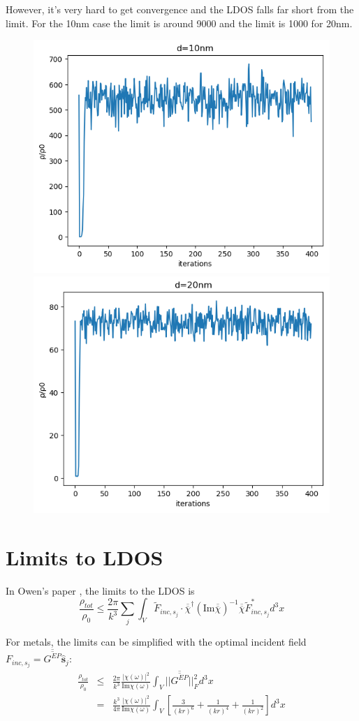 \documentclass[12pt]{article}
\begin{document}
However, it's very hard to get convergence and the LDOS falls far short from the limit. For the 10nm case the limit is around 9000 and the limit is 1000 for 20nm.

\begin{figure}[H]
\centering
\includegraphics[width=0.45\linewidth]{10cov.png}
\includegraphics[width=0.45\linewidth]{20cov.png}
\end{figure}

\section{Limits to LDOS}
In Owen's paper \cite{main}, the limits to the LDOS is 
\begin{equation}
\frac{\rho_{tot}}{\rho_0} \leq \frac{2\pi}{k^3}\sum_j\int_V\tilde{F}_{inc,s_j}\cdot\overline{\overline{\chi}}^\dagger(\mathrm{Im}\overline{\overline{\chi}})^{-1}\overline{\overline{\chi}} \tilde{F}_{inc,s_j}^*d^3x
\end{equation}

For metals, the limits can be simplified with the optimal incident field $F_{inc,s_j}=\overline{\overline{G^{EP}}}\hat{\mathbf{s}}_j$:
\begin{eqnarray}
\frac{\rho_{tot}}{\rho_0} &\leq& \frac{2\pi}{k^3}\frac{|\chi(\omega)|^2}{\mathrm{Im}\chi(\omega)}\int_V||\overline{\overline{G^{EP}}}||^2_Fd^3x\\
&=& \frac{k^3}{4\pi}\frac{|\chi(\omega)|^2}{\mathrm{Im}\chi(\omega)}\int_V[\frac{3}{(kr)^6}+\frac{1}{(kr)^4}+\frac{1}{(kr)^2}]d^3x
\end{eqnarray}
\end{document}
